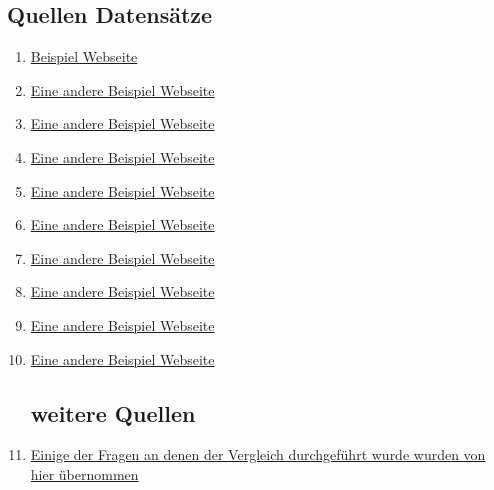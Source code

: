 \documentclass[12pt]{article}
\begin{document}
	\subsection{Quellen Datensätze}
	
	\begin{enumerate}
		\item \href{https://example.com}{Beispiel Webseite}
		\item \href{https://example.org}{Eine andere Beispiel Webseite}
		\item \href{https://example.org}{Eine andere Beispiel Webseite}
		\item \href{https://example.org}{Eine andere Beispiel Webseite}
		\item \href{https://example.org}{Eine andere Beispiel Webseite}
		\item \href{https://example.org}{Eine andere Beispiel Webseite}
		\item \href{https://example.org}{Eine andere Beispiel Webseite}
		\item \href{https://example.org}{Eine andere Beispiel Webseite}
		\item \href{https://example.org}{Eine andere Beispiel Webseite}
		\item \href{https://example.org}{Eine andere Beispiel Webseite}
		
		\subsection{weitere Quellen}
		\item \href{https://www.gapminder.org/}{Einige der Fragen an denen der Vergleich durchgeführt wurde wurden von hier übernommen}
		
	\end{enumerate}
	
\end{document}
